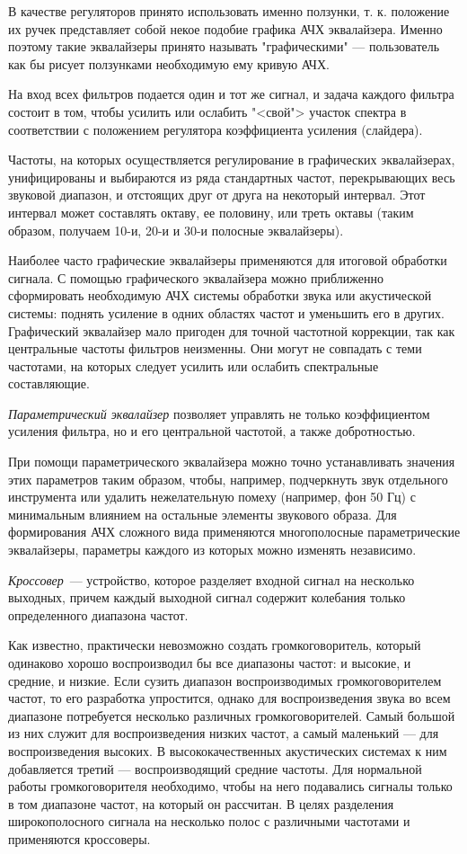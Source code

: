 \documentclass[oneside, final, 14pt]{extreport}
\begin{document}
В качестве регуляторов принято использовать именно ползунки, т. к. положение их ручек представляет собой некое подобие графика АЧХ эквалайзера. Именно поэтому такие эквалайзеры принято называть "графическими" — пользователь как бы рисует ползунками необходимую ему кривую АЧХ.

На вход всех фильтров подается один и тот же сигнал, и задача каждого фильтра состоит в том, чтобы усилить или ослабить "<свой"> участок спектра в соответствии с положением регулятора коэффициента усиления (слайдера).

Частоты, на которых осуществляется регулирование в графических эквалайзерах, унифицированы и выбираются из ряда стандартных частот, перекрывающих весь звуковой диапазон, и отстоящих друг от друга на некоторый интервал. Этот интервал может составлять октаву, ее половину, или треть октавы (таким образом, получаем 10-и, 20-и и 30-и полосные эквалайзеры).

Наиболее часто графические эквалайзеры применяются для итоговой обработки сигнала. С помощью графического эквалайзера можно приближенно сформировать необходимую АЧХ системы обработки звука или акустической системы: поднять усиление в одних областях частот и уменьшить его в других. Графический эквалайзер мало пригоден для точной частотной коррекции, так как центральные частоты фильтров неизменны. Они могут не совпадать с теми частотами, на которых следует усилить или ослабить спектральные составляющие.

\emph{Параметрический эквалайзер} позволяет управлять не только коэффициентом усиления фильтра, но и его центральной частотой, а также добротностью.

При помощи параметрического эквалайзера можно точно устанавливать значения этих параметров таким образом, чтобы, например, подчеркнуть звук отдельного инструмента или удалить нежелательную помеху (например, фон 50 Гц) с минимальным влиянием на остальные элементы звукового образа. Для формирования АЧХ сложного вида применяются многополосные параметрические эквалайзеры, параметры каждого из которых можно изменять независимо.

\emph{Кроссовер}~--- устройство, которое разделяет входной сигнал на несколько выходных, причем каждый выходной сигнал содержит колебания только определенного диапазона частот.

Как известно, практически невозможно создать громкоговоритель, который одинаково хорошо воспроизводил бы все диапазоны частот: и высокие, и средние, и низкие. Если сузить диапазон воспроизводимых громкоговорителем частот, то его разработка упростится, однако для воспроизведения звука во всем диапазоне потребуется несколько различных громкоговорителей. Самый большой из них служит для воспроизведения низких частот, а самый маленький — для воспроизведения высоких. В высококачественных акустических системах к ним добавляется третий — воспроизводящий средние частоты. Для нормальной работы громкоговорителя необходимо, чтобы на него подавались сигналы только в том диапазоне частот, на который он рассчитан. В целях разделения широкополосного сигнала на несколько полос с различными частотами и применяются кроссоверы.
\end{document}

